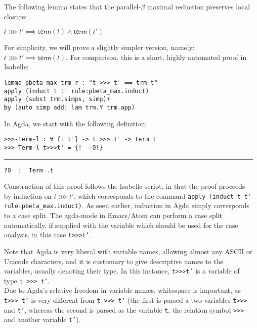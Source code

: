\documentclass[a4paper, 12pt, twoside]{style/ociamthesis}
\theoremstyle{plain}
\theoremstyle{definition}
\newtheorem{Example}{Example}[chapter]
\theoremstyle{remark}
\newtheorem*{Remark}{Remark}
\newcommand{\trm}{\textsf{term}}
\renewenvironment{Example}{\begin{OldExample}\begin{mdframed}[style=example, linecolor=yellow]}{\end{mdframed}\end{OldExample}}
\renewenvironment{Remark}{\begin{OldRemark}\begin{mdframed}[style=example, linecolor=black]}{\end{mdframed}\end{OldRemark}}
\begin{document}
\begin{Example}

The following lemma states that the parallel-\(\beta\) maximal reduction
preserves local closure:

\begin{center}
$t \ggg t' \implies \trm(t) \land \trm(t')$
\end{center}

For simplicity, we will prove a slightly simpler version, namely:
\(t \ggg t' \implies \trm(t)\). For comparison, this is a short, highly
automated proof in Isabelle:

\begin{verbatim}
lemma pbeta_max_trm_r : "t >>> t' ⟹ trm t"
apply (induct t t' rule:pbeta_max.induct)
apply (subst trm.simps, simp)+
by (auto simp add: lam trm.Y trm.app)
\end{verbatim}

In Agda, we start with the following definition:

\begin{verbatim}
>>>-Term-l : ∀ {t t'} -> t >>> t' -> Term t
>>>-Term-l t>>>t' = {!   0!}
\end{verbatim}

\noindent\rule{8cm}{0.4pt}

\begin{verbatim}
?0  :  Term .t
\end{verbatim}

Construction of this proof follows the Isabelle script, in that the
proof proceeds by induction on \(t \ggg t'\), which corresponds to the
command \texttt{apply (induct t t' rule:pbeta\_max.induct)}. As seen
earlier, induction in Agda simply corresponds to a case split. The
agda-mode in Emacs/Atom can perform a case split automatically, if
supplied with the variable which should be used for the case analysis,
in this case \texttt{t>>>t'}.

\vspace{1em}

\begin{Remark}

Note that Agda is very liberal with variable names, allowing almost any
ASCII or Unicode characters, and it is customary to give descriptive
names to the variables, usually denoting their type. In this instance,
\texttt{t>>>t'} is a variable of type \texttt{t >>> t'}.\\
Due to Agda's relative freedom in variable names, whitespace is
important, as \texttt{t>>> t'} is very different from \texttt{t >>> t'}
(the first is parsed a two variables \texttt{t>>>} and \texttt{t'},
whereas the second is parsed as the variable \texttt{t}, the relation
symbol \texttt{>>>} and another variable \texttt{t'}).


\end{Remark}
\end{Example}
\end{document}
